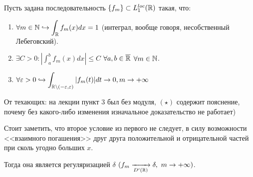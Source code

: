 \begin{theorem}
    Пусть задана последовательность $\{f_m\} \subset L_1^{loc}(\mathbb{R})$ такая, что:
    \begin{enumerate}
        \item $\displaystyle \forall m \in \mathbb{N} \hookrightarrow \int_{\mathbb{R}} f_m(x) dx = 1$ (интеграл, вообще говоря, несобственный Лебеговский).
        
        \item $\displaystyle \exists C > 0 : \left|\int_a^b f_m(x)dx\right| \leq C$ $\forall a, b \in \overline{\mathbb{R}}$ $\forall m \in \mathbb{N}$.
        
        \item $\displaystyle \forall \varepsilon > 0 \hookrightarrow \int_{\mathbb{R} \setminus (-\varepsilon, \varepsilon)} |f_m(t)|dt \rightarrow 0, m \rightarrow +\infty$
    \end{enumerate}
    \begin{remark}
        От техающих: на лекции пункт $3$ был без модуля, $(\star)$ содержит пояснение, почему без какого-либо изменения изначальное доказательство не работает)
    \end{remark}
    \begin{note}
        Стоит заметить, что второе условие из первого не следует, в силу возможности <<взаимного погашения>> друг друга положительной и отрицательной частей при сколь угодно больших $x$.
    \end{note}
    Тогда она является регуляризацией $\delta$ $(f_m \xrightarrow[D'(\mathbb{R})]{} \delta, \ m \rightarrow +\infty)$.
\end{theorem}
